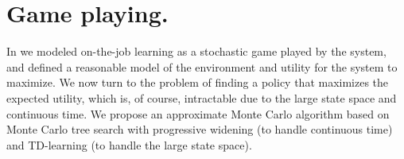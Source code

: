%
%

\section{Game playing.}
\label{sec:game-playing}

In  we modeled on-the-job learning as a stochastic game played by the system, and defined a reasonable model of the environment and utility for the system to maximize.
We now turn to the problem of finding a policy that maximizes the expected utility, which is, of course, intractable due to the large state space and continuous time\reword.
We propose an approximate Monte Carlo algorithm based on Monte Carlo tree search with progressive widening (to handle continuous time) and TD-learning (to handle the large state space).


